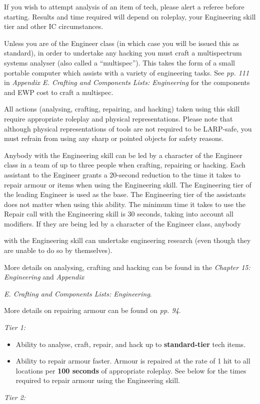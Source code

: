 If you wish to attempt analysis of an item of tech, please alert a referee before starting. Results and time required will depend on roleplay, your Engineering skill tier and other IC circumstances.

Unless you are of the Engineer class (in which case you will be issued this as standard), in order to undertake any hacking you must craft a multispectrum systems analyser (also called a ``multispec''). This takes the form of a small portable computer which assists with a variety of engineering tasks. See \textit{pp. 111} in \textit{Appendix E. Crafting and Components Lists: Engineering} for the components and EWP cost to craft a multispec.

All actions (analysing, crafting, repairing, and hacking) taken using this skill require appropriate roleplay and physical representations. Please note that although physical representations of tools are not required to be LARP-safe, you must refrain from using any sharp or pointed objects for safety reasons.

Anybody with the Engineering skill can be led by a character of the Engineer class in a team of up to three people when crafting, repairing or hacking. Each assistant to the Engineer grants a 20-second reduction to the time it takes to repair armour or items when using the Engineering skill. The Engineering tier of the leading Engineer is used as the base. The Engineering tier of the assistants does not matter when using this ability. The minimum time it takes to use the Repair call with the Engineering skill is 30 seconds, taking into account all modifiers. If they are being led by a character of the Engineer class, anybody

with the Engineering skill can undertake engineering research (even though they are unable to do so by themselves).

More details on analysing, crafting and hacking can be found in the \textit{Chapter 15: Engineering} and \textit{Appendix}

\textit{E. Crafting and Components Lists: Engineering}.

More details on repairing armour can be found on \textit{pp. 94}.

\textit{Tier 1:}

\begin{itemize}
\item Ability to analyse, craft, repair, and hack up to \textbf{standard-tier} tech items.

\item Ability to repair armour faster. Armour is repaired at the rate of 1 hit to all locations per \textbf{100 seconds} of appropriate roleplay. See below for the times required to repair armour using the Engineering skill.

\end{itemize}
\textit{Tier 2:}

